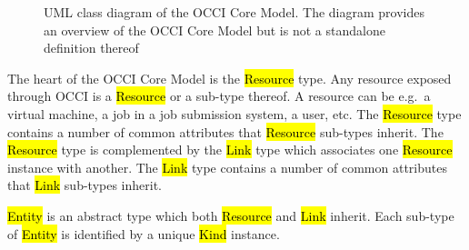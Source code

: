 \documentclass[10pt,a4paper]{article}
\begin{document}
\begin{figure}[!h]
{\centering {} \par}
\caption{UML class diagram of the OCCI Core Model. The diagram provides an
overview of the OCCI Core Model but is not a standalone definition thereof}
\label{fig:occi_model}
\end{figure}

The heart of the OCCI Core Model is the \hl{Resource} type. Any resource exposed
through OCCI is a \hl{Resource} or a sub-type thereof.
A resource can be e.g.~a virtual machine, a job in a job submission system, a
user, etc.
%
The \hl{Resource} type contains a number of common attributes that
\hl{Resource} sub-types inherit. The \hl{Resource} type is
complemented by the \hl{Link} type which associates one \hl{Resource} instance
with another.
%
The \hl{Link} type contains a number of common attributes that
\hl{Link} sub-types inherit.

\hl{Entity} is an abstract type which both \hl{Resource} and \hl{Link} inherit.
Each sub-type of \hl{Entity} is identified by a unique \hl{Kind} instance.
%
\end{document}
